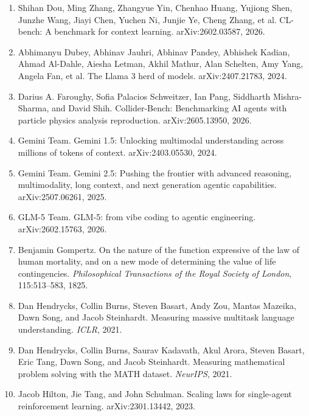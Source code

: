 \begin{enumerate}
\item Shihan Dou, Ming Zhang, Zhangyue Yin, Chenhao Huang, Yujiong Shen, Junzhe Wang, Jiayi Chen, Yuchen Ni, Junjie Ye, Cheng Zhang, et al. CL-bench: A benchmark for context learning. arXiv:2602.03587, 2026.

\item Abhimanyu Dubey, Abhinav Jauhri, Abhinav Pandey, Abhishek Kadian, Ahmad Al-Dahle, Aiesha Letman, Akhil Mathur, Alan Schelten, Amy Yang, Angela Fan, et al. The Llama 3 herd of models. arXiv:2407.21783, 2024.

\item Darius A. Faroughy, Sofia Palacios Schweitzer, Ian Pang, Siddharth Mishra-Sharma, and David Shih. Collider-Bench: Benchmarking AI agents with particle physics analysis reproduction. arXiv:2605.13950, 2026.

\item Gemini Team. Gemini 1.5: Unlocking multimodal understanding across millions of tokens of context. arXiv:2403.05530, 2024.

\item Gemini Team. Gemini 2.5: Pushing the frontier with advanced reasoning, multimodality, long context, and next generation agentic capabilities. arXiv:2507.06261, 2025.

\item GLM-5 Team. GLM-5: from vibe coding to agentic engineering. arXiv:2602.15763, 2026.

\item Benjamin Gompertz. On the nature of the function expressive of the law of human mortality, and on a new mode of determining the value of life contingencies. \textit{Philosophical Transactions of the Royal Society of London}, 115:513--583, 1825.

\item Dan Hendrycks, Collin Burns, Steven Basart, Andy Zou, Mantas Mazeika, Dawn Song, and Jacob Steinhardt. Measuring massive multitask language understanding. \textit{ICLR}, 2021.

\item Dan Hendrycks, Collin Burns, Saurav Kadavath, Akul Arora, Steven Basart, Eric Tang, Dawn Song, and Jacob Steinhardt. Measuring mathematical problem solving with the MATH dataset. \textit{NeurIPS}, 2021.

\item Jacob Hilton, Jie Tang, and John Schulman. Scaling laws for single-agent reinforcement learning. arXiv:2301.13442, 2023.


\end{enumerate}
